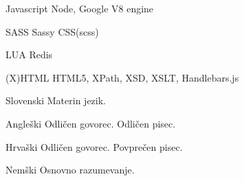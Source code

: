 \begin{cvskills}
\cvskill
{Javascript} %
{Node, Google V8 engine} %

\cvskill
{SASS} %
{Sassy CSS(scss)} %

\cvskill
{LUA} %
{Redis} %

\cvskill
{(X)HTML} %
{HTML5, XPath, XSD, XSLT, Handlebars.js} %
\end{cvskills}




\begin{cvskills}


\cvskill
{Slovenski} %
{Materin jezik.} %


\cvskill
{Angleški} %
{Odličen govorec. Odličen pisec.} %


\cvskill
{Hrvaški} %
{Odličen govorec. Povprečen pisec.} %


\cvskill
{Nemški} %
{Osnovno razumevanje.} %

\end{cvskills}


